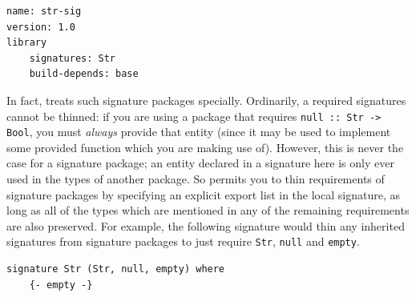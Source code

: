 \begin{verbatim}
name: str-sig
version: 1.0
library
    signatures: Str
    build-depends: base
\end{verbatim}

In fact, \Backpack{} treats such signature packages specially.
Ordinarily, a required signatures cannot be thinned: if you are using a
package that requires \verb|null :: Str -> Bool|, you must \emph{always}
provide that entity (since it may be used to implement some provided
function which you are making use of).  However, this is never the case
for a signature package; an entity declared in a signature here is only
ever used in the types of another package.  So \Backpack{} permits you
to thin requirements of signature packages by specifying an explicit
export list in the local signature, as long as all of the types which
are mentioned in any of the remaining requirements are also preserved.
For example, the following signature would thin any inherited signatures
from signature packages to just require \verb|Str|, \verb|null| and
\verb|empty|.

\begin{verbatim}
signature Str (Str, null, empty) where
    {- empty -}
\end{verbatim}

